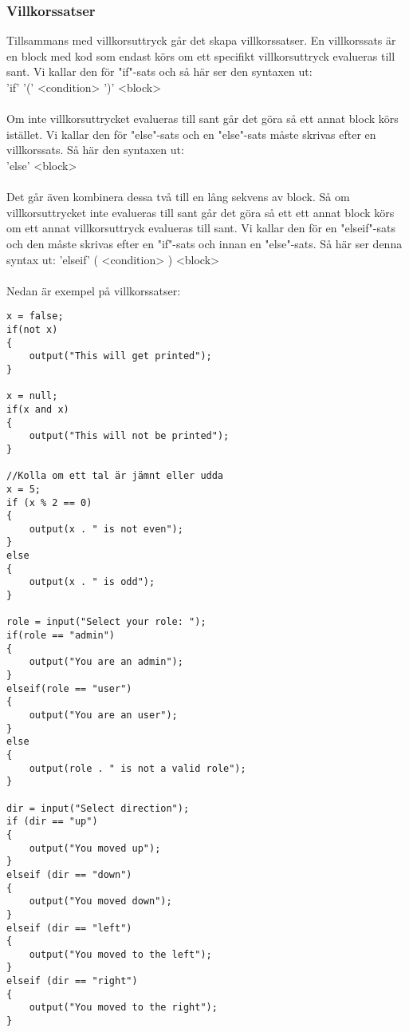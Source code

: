 \documentclass{TDP003mall}
\begin{document}
\newpage

\subsubsection{Villkorssatser}
Tillsammans med villkorsuttryck går det skapa villkorssatser. En villkorssats är en block med kod som endast körs om ett specifikt villkorsuttryck evalueras till sant. Vi kallar den för "if"-sats och så här ser den syntaxen ut:
\\
'if' '(' <condition> ')' <block>
\\\\
Om inte villkorsuttrycket evalueras till sant går det göra så ett annat block körs istället. Vi kallar den för "else"-sats och en "else"-sats måste skrivas efter en villkorssats. Så här den syntaxen ut:
\\
'else' <block>
\\\\
Det går även kombinera dessa två till en lång sekvens av block. Så om villkorsuttrycket inte evalueras till sant går det göra så ett ett annat block körs om ett annat villkorsuttryck evalueras till sant. Vi kallar den för en "elseif"-sats och den måste skrivas efter en "if"-sats och innan en "else"-sats. Så här ser denna syntax ut:
'elseif' ( <condition> ) <block>
\\\\
Nedan är exempel på villkorssatser:
\begin{lstlisting}
x = false;
if(not x)
{
    output("This will get printed");
}

x = null;
if(x and x)
{
    output("This will not be printed");
}

//Kolla om ett tal är jämnt eller udda
x = 5;
if (x % 2 == 0)
{
    output(x . " is not even");
}
else
{
    output(x . " is odd");
}

role = input("Select your role: ");
if(role == "admin")
{
    output("You are an admin");
}
elseif(role == "user")
{
    output("You are an user");
}
else
{
    output(role . " is not a valid role");
}

dir = input("Select direction");
if (dir == "up")
{
    output("You moved up");
}
elseif (dir == "down")
{
    output("You moved down");
}
elseif (dir == "left")
{
    output("You moved to the left");
}
elseif (dir == "right")
{
    output("You moved to the right");
}
\end{lstlisting}
\end{document}
